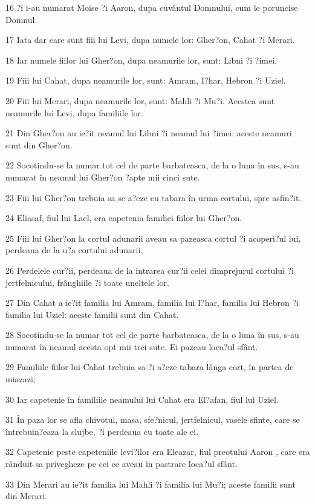\par 16 ?i i-au numarat Moise ?i Aaron, dupa cuvântul Domnului, cum le poruncise Domnul.
\par 17 Iata dar care sunt fiii lui Levi, dupa numele lor: Gher?on, Cahat ?i Merari.
\par 18 Iar numele fiilor lui Gher?on, dupa neamurile lor, sunt: Libni ?i ?imei.
\par 19 Fiii lui Cahat, dupa neamurile lor, sunt: Amram, I?har, Hebron ?i Uziel.
\par 20 Fiii lui Merari, dupa neamurile lor, sunt: Mahli ?i Mu?i. Acestea sunt neamurile lui Levi, dupa familiile lor.
\par 21 Din Gher?on au ie?it neamul lui Libni ?i neamul lui ?imei: aceste neamuri sunt din Gher?on.
\par 22 Socotindu-se la numar tot cel de parte barbateasca, de la o luna în sus, s-au numarat în neamul lui Gher?on ?apte mii cinci sute.
\par 23 Fiii lui Gher?on trebuia sa se a?eze cu tabara în urma cortului, spre asfin?it.
\par 24 Eliasaf, fiul lui Lael, era capetenia familiei fiilor lui Gher?on.
\par 25 Fiii lui Gher?on la cortul adunarii aveau sa pazeasca cortul ?i acoperi?ul lui, perdeaua de la u?a cortului adunarii,
\par 26 Perdelele cur?ii, perdeaua de la intrarea cur?ii celei dimprejurul cortului ?i jertfelnicului, frânghiile ?i toate uneltele lor.
\par 27 Din Cahat a ie?it familia lui Amram, familia lui I?har, familia lui Hebron ?i familia lui Uziel: aceste familii sunt din Cahat.
\par 28 Socotindu-se la numar tot cel de parte barbateasca, de la o luna în sus, s-au numarat în neamul acesta opt mii trei sute. Ei pazeau loca?ul sfânt.
\par 29 Familiile fiilor lui Cahat trebuia sa-?i a?eze tabara lânga cort, în partea de miazazi;
\par 30 Iar capetenie în familiile neamului lui Cahat era El?afan, fiul lui Uziel.
\par 31 În paza lor se afla chivotul, masa, sfe?nicul, jertfelnicul, vasele sfinte, care se întrebuin?eaza la slujbe, ?i perdeaua cu toate ale ei.
\par 32 Capetenie peste capeteniile levi?ilor era Eleazar, fiul preotului Aaron , care era rânduit sa privegheze pe cei ce aveau în pastrare loca?ul sfânt.
\par 33 Din Merari au ie?it familia lui Mahli ?i familia lui Mu?i; aceste familii sunt din Merari.
